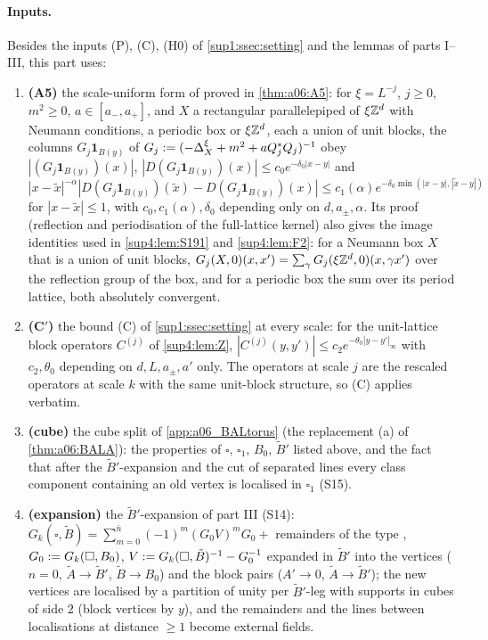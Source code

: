 \paragraph{Inputs.} Besides the inputs (P), (C), (H0) of \cref{sup1:ssec:setting} and the lemmas of parts I--III, this part uses:
\begin{enumerate}[label=\textup{(\roman*)},nosep,leftmargin=*]
\item \textbf{(A5)} the scale-uniform form of \cite[Lemma~2.4]{Ba4} proved in \cref{thm:a06:A5}: for $\xi=L^{-j}$, $j\ge0$, $m^2\ge0$, $a\in[a_-,a_+]$, and $X$ a rectangular parallelepiped of $\xi\mathbb Z^d$ with Neumann conditions, a periodic box or $\xi\mathbb Z^d$, each a union of unit blocks, the columns $G_j\mathbf 1_{B(y)}$ of $G_j:=(-\Delta^\xi_X+m^2+aQ_j^*Q_j)^{-1}$ obey $|(G_j\mathbf 1_{B(y)})(x)|$, $|D(G_j\mathbf 1_{B(y)})(x)|\le c_0e^{-\delta_0|x-y|}$ and $|x-\tilde x|^{-\alpha}|D(G_j\mathbf 1_{B(y)})(\tilde x)-D(G_j\mathbf 1_{B(y)})(x)|\le c_1(\alpha)e^{-\delta_0\min(|x-y|,|\tilde x-y|)}$ for $|x-\tilde x|\le1$, with $c_0,c_1(\alpha),\delta_0$ depending only on $d,a_\pm,\alpha$. Its proof (reflection and periodisation of the full-lattice kernel) also gives the image identities used in \cref{sup4:lem:S191} and \cref{sup4:lem:F2}: for a Neumann box $X$ that is a union of unit blocks, $G_j(X,0)(x,x')=\sum_{\gamma}G_j(\xi\mathbb Z^d,0)(x,\gamma x')$ over the reflection group of the box, and for a periodic box the sum over its period lattice, both absolutely convergent.
\item \textbf{(C$'$)} the bound (C) of \cref{sup1:ssec:setting} at every scale: for the unit-lattice block operators $C^{(j)}$ of \cref{sup4:lem:Z}, $|C^{(j)}(y,y')|\le c_2e^{-\theta_0|y-y'|_\infty}$ with $c_2,\theta_0$ depending on $d,L,a_\pm,a'$ only. The operators at scale $j$ are the rescaled operators at scale $k$ with the same unit-block structure, so (C) applies verbatim.
\item \textbf{(cube)} the cube split of \cref{app:a06_BALtorus} (the replacement (a) of \cref{thm:a06:BALA}): the properties of $\square$, $\square_1$, $B_0$, $\tilde B'$ listed above, and the fact that after the $\tilde B'$-expansion and the cut of separated lines every class component containing an old vertex is localised in $\square_1$ (S15).
\item \textbf{(expansion)} the $\tilde B'$-expansion of part III (S14): $G_k(\square,\tilde B)=\sum_{m=0}^{\bar n}(-1)^m(G_0V)^mG_0+$ remainders of the type \cite[(1.16)]{Ba3}, $G_0:= G_k(\square,B_0)$, $V:= G_k(\square,\tilde B)^{-1}-G_0^{-1}$ expanded in $\tilde B'$ into the vertices \cite[(1.8)--(1.11)]{Ba3} ($n=0$, $\tilde A\to\tilde B'$, $\tilde B\to B_0$) and the block pairs \cite[(1.13)--(1.15)]{Ba3} ($A'\to0$, $\tilde A\to\tilde B'$); the new vertices are localised by a partition of unity per $\tilde B'$-leg with supports in cubes of side $2$ (block vertices by $y$), and the remainders and the lines between localisations at distance $\ge1$ become external fields.
\end{enumerate}

